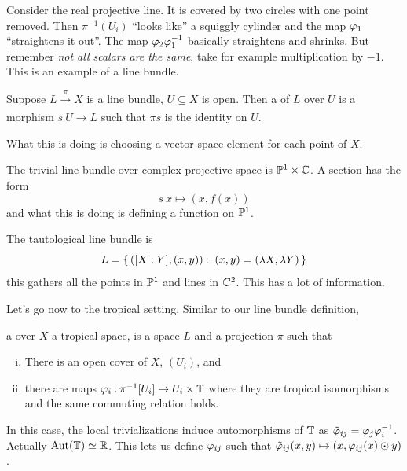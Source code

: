 \documentclass[12pt]{memoir}
\theoremstyle{definition}
\def\la{\lambda}
\begin{document}
\begin{Ex}
    Consider the real projective line. It is covered by two circles with one point removed. Then $\pi^{-1}(U_i)$ ``looks like'' a squiggly cylinder and the map $\varphi_1$ ``straightens it out''. The map $\varphi_2\varphi_1^{-1}$ basically straightens and shrinks. But remember \emph{not all scalars are the same}, take for example multiplication by $-1$. This is an example of a line bundle.
\end{Ex}

\begin{Def}
    Suppose $L\xrightarrow[]{\pi}X$ is a line bundle, $U\subseteq X$ is open. Then a  of $L$ over $U$ is a morphism $s\: U\to L$ such that $\pi s$ is the identity on $U$.
\end{Def}

What this is doing is choosing a vector space element for each point of $X$.

\begin{Ex}
    The trivial line bundle over complex projective space is $\mathbb{P}^1\times\mathbb{C}$. A section has the form 
    $$s\: x\mapsto (x,f(x))$$
    and what this is doing is defining a function on $\mathbb{P}^1$.
\end{Ex}

\begin{Ex}
    The tautological line bundle is 
    $$L=\set{([X:Y],(x,y))\:\ (x,y)=(\la X,\la Y)}$$
    this gathers all the points in $\mathbb{P}^1$ and lines in $\mathbb{C}^2$. This has a lot of information. 
\end{Ex}

Let's go now to the tropical setting. Similar to our line bundle definition, 

\begin{Def}
a  over $X$ a tropical space, is a space $L$ and a projection $\pi$ such that 
\begin{enumerate}[i)]
    \item There is an open cover of $X$, $(U_i)$, and
    \item there are maps $\varphi_i\mathbin{:} \pi^{-1}[U_i]\to U_i\times\mathbb{T}$ where they are tropical isomorphisms and the same commuting relation holds.
\end{enumerate}    
\end{Def}

In this case, the local trivializations induce automorphisms of $\mathbb{T}$ as $\tilde{\varphi}_{ij}=\varphi_j\varphi_i^{-1}$. Actually $\operatorname{Aut}(\mathbb{T})\simeq \mathbb{R}$. This lets us define $\varphi_{ij}$ such that $\tilde{\varphi}_{ij}(x,y)\mapsto (x,\varphi_{ij}(x)\odot y)$.
\end{document}
